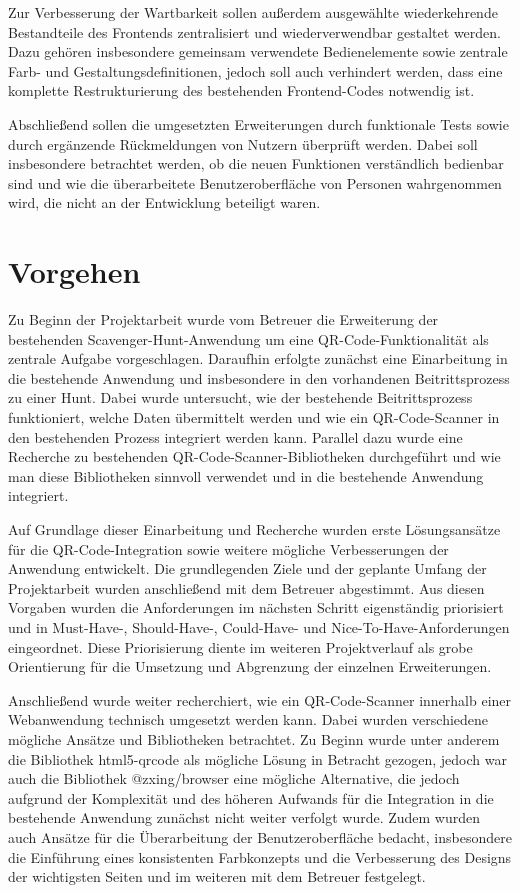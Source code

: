 ﻿\documentclass[oneside]{ausarbeitung}
\begin{document}
Zur Verbesserung der Wartbarkeit sollen außerdem ausgewählte wiederkehrende Bestandteile des Frontends zentralisiert und wiederverwendbar gestaltet 
werden. Dazu gehören insbesondere gemeinsam verwendete Bedienelemente sowie zentrale Farb- und Gestaltungsdefinitionen, jedoch soll auch verhindert 
werden, dass eine komplette Restrukturierung des bestehenden Frontend-Codes notwendig ist.

Abschließend sollen die umgesetzten Erweiterungen durch funktionale Tests sowie durch ergänzende Rückmeldungen von Nutzern überprüft werden.
Dabei soll insbesondere betrachtet werden, ob die neuen Funktionen verständlich bedienbar sind und wie die überarbeitete Benutzeroberfläche
von Personen wahrgenommen wird, die nicht an der Entwicklung beteiligt waren.



\section{Vorgehen}
\label{sec:vorgehen}


Zu Beginn der Projektarbeit wurde vom Betreuer die Erweiterung der bestehenden Scavenger-Hunt-Anwendung um eine QR-Code-Funktionalität als zentrale
Aufgabe vorgeschlagen. Daraufhin erfolgte zunächst eine Einarbeitung in die bestehende Anwendung und insbesondere in den vorhandenen Beitrittsprozess 
zu einer Hunt. Dabei wurde untersucht, wie der bestehende Beitrittsprozess funktioniert, welche Daten übermittelt werden und wie ein QR-Code-Scanner
in den bestehenden Prozess integriert werden kann. Parallel dazu wurde eine Recherche zu bestehenden QR-Code-Scanner-Bibliotheken durchgeführt und
wie man diese Bibliotheken sinnvoll verwendet und in die bestehende Anwendung integriert.

Auf Grundlage dieser Einarbeitung und Recherche wurden erste Lösungsansätze für die QR-Code-Integration sowie weitere mögliche Verbesserungen der 
Anwendung entwickelt. Die grundlegenden Ziele und der geplante Umfang der Projektarbeit wurden anschließend mit dem Betreuer abgestimmt. 
Aus diesen Vorgaben wurden die Anforderungen im nächsten Schritt eigenständig priorisiert und in Must-Have-, Should-Have-, Could-Have- und 
Nice-To-Have-Anforderungen eingeordnet. Diese Priorisierung diente im weiteren Projektverlauf als grobe Orientierung für die Umsetzung und Abgrenzung 
der einzelnen Erweiterungen.

Anschließend wurde weiter recherchiert, wie ein QR-Code-Scanner innerhalb einer Webanwendung technisch umgesetzt werden kann. Dabei wurden verschiedene 
mögliche Ansätze und Bibliotheken betrachtet. Zu Beginn wurde unter anderem die Bibliothek html5-qrcode als mögliche Lösung in Betracht gezogen, jedoch 
war auch die Bibliothek @zxing/browser eine mögliche Alternative, die jedoch aufgrund der Komplexität und des höheren Aufwands für die Integration 
in die bestehende Anwendung zunächst nicht weiter verfolgt wurde. Zudem wurden auch Ansätze für die Überarbeitung der Benutzeroberfläche bedacht,
insbesondere die Einführung eines konsistenten Farbkonzepts und die Verbesserung des Designs der wichtigsten Seiten und im weiteren mit dem Betreuer 
festgelegt. 
\end{document}
